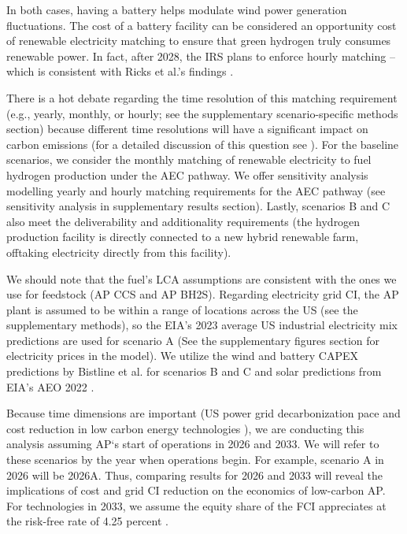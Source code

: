 \documentclass{article}
\begin{document}
In both cases, having a battery helps modulate wind power generation fluctuations. The cost of a battery facility can be considered an opportunity cost of renewable electricity matching to ensure that green hydrogen truly consumes renewable power. In fact, after 2028, the IRS plans to enforce hourly matching \cite{IRS2023} – which is consistent with Ricks et al.'s findings \cite{Ricks2023}.

There is a hot debate regarding the time resolution of this matching requirement (e.g., yearly, monthly, or hourly; see the supplementary scenario-specific methods section) because different time resolutions will have a significant impact on carbon emissions (for a detailed discussion of this question see \cite{Ricks2023}). For the baseline scenarios, we consider the monthly matching of renewable electricity to fuel hydrogen production under the AEC pathway. We offer sensitivity analysis modelling yearly and hourly matching requirements for the AEC pathway (see sensitivity analysis in supplementary results section). Lastly, scenarios B and C also meet the deliverability and additionality requirements (the hydrogen production facility is directly connected to a new hybrid renewable farm, offtaking electricity directly from this facility).

We should note that the fuel’s LCA assumptions are consistent with the ones we use for feedstock (AP CCS and AP BH2S). Regarding electricity grid CI, the AP plant is assumed to be within a range of locations  across the US (see the supplementary methods), so the EIA’s 2023  average US industrial electricity mix predictions are used for scenario A \cite{EIA2023b} (See the supplementary figures section for electricity prices in the model). We utilize the wind and battery CAPEX predictions by Bistline et al. for scenarios B and C  and solar predictions from EIA’s AEO 2022 \cite{Bistline2023}.  

Because time dimensions are important (US power grid decarbonization pace and cost reduction in low carbon energy technologies ), we are conducting this analysis assuming AP‘s start of operations in 2026 and 2033. We will refer to these scenarios by the year when operations begin. For example, scenario A in 2026 will be 2026A. Thus, comparing results for 2026 and 2033 will reveal the implications of cost and grid CI reduction on the economics of low-carbon AP. For technologies in 2033, we assume the equity share of the FCI appreciates at the risk-free rate of 4.25 percent \cite{Damodaran2023}. 
\end{document}
